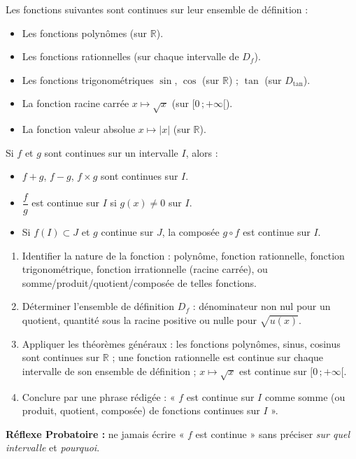\documentclass[11pt]{article}
\newcommand{\cle}[1]{{\popxbold\color{popdark}#1}}
\begin{document}
\begin{propriete}
Les fonctions suivantes sont continues sur leur ensemble de définition :
\begin{itemize}
\item Les fonctions \cle{polynômes} (sur $\mathbb{R}$).
\item Les fonctions \cle{rationnelles} (sur chaque intervalle de $D_f$).
\item Les fonctions \cle{trigonométriques} $\sin$, $\cos$ (sur $\mathbb{R}$) ; $\tan$ (sur $D_{\tan}$).
\item La fonction \cle{racine carrée} $x \mapsto \sqrt{x}$ (sur $[0\,;+\infty[$).
\item La fonction \cle{valeur absolue} $x \mapsto |x|$ (sur $\mathbb{R}$).
\end{itemize}
\end{propriete}

\begin{propriete}
Si $f$ et $g$ sont continues sur un intervalle $I$, alors :
\begin{itemize}
\item $f+g$, $f-g$, $f \times g$ sont continues sur $I$.
\item $\dfrac{f}{g}$ est continue sur $I$ si $g(x) \neq 0$ sur $I$.
\item Si $f(I) \subset J$ et $g$ continue sur $J$, la \cle{composée} $g \circ f$ est continue sur $I$.
\end{itemize}
\end{propriete}

\begin{methode}
\begin{enumerate}
\item \cle{Identifier} la nature de la fonction : polynôme, fonction rationnelle, fonction trigonométrique, fonction irrationnelle (racine carrée), ou somme/produit/quotient/composée de telles fonctions.
\item \cle{Déterminer l'ensemble de définition} $D_f$ : dénominateur non nul pour un quotient, quantité sous la racine positive ou nulle pour $\sqrt{u(x)}$.
\item \cle{Appliquer les théorèmes généraux} : les fonctions polynômes, sinus, cosinus sont continues sur $\mathbb{R}$ ; une fonction rationnelle est continue sur chaque intervalle de son ensemble de définition ; $x \mapsto \sqrt{x}$ est continue sur $[0\,;+\infty[$.
\item \cle{Conclure} par une phrase rédigée : « $f$ est continue sur $I$ comme somme (ou produit, quotient, composée) de fonctions continues sur $I$ ».
\end{enumerate}
\textbf{Réflexe Probatoire :} ne jamais écrire « $f$ est continue » sans préciser \emph{sur quel intervalle} et \emph{pourquoi}.
\end{methode}
\end{document}
